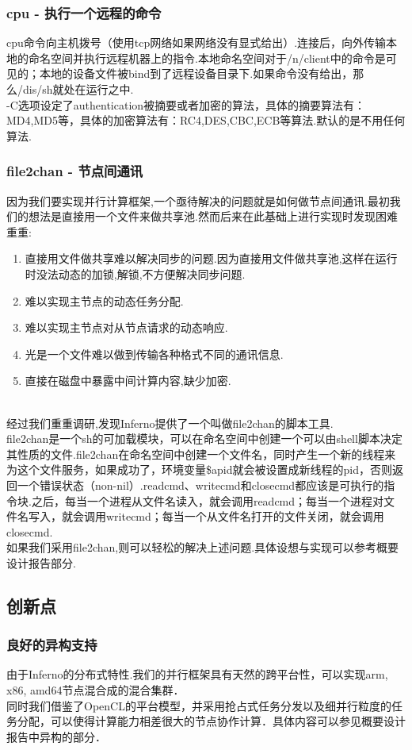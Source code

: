 \documentclass[paper=a4]{ctexart} %
\numberwithin{equation}{section} %
\numberwithin{figure}{section} %
\numberwithin{table}{section} %
\newcommand{\n}{\\\indent}
\begin{document}
\subsubsection{cpu - 执行一个远程的命令}
cpu命令向主机拨号（使用tcp网络如果网络没有显式给出）.连接后，向外传输本地的命名空间并执行远程机器上的指令.本地命名空间对于/n/client中的命令是可见的；本地的设备文件被bind到了远程设备目录下.如果命令没有给出，那么/dis/sh就处在运行之中. \n
-C选项设定了authentication被摘要或者加密的算法，具体的摘要算法有：MD4,MD5等，具体的加密算法有：RC4,DES,CBC,ECB等算法.默认的是不用任何算法.

\subsubsection{file2chan - 节点间通讯}
因为我们要实现并行计算框架,一个亟待解决的问题就是如何做节点间通讯.最初我们的想法是直接用一个文件来做共享池.然而后来在此基础上进行实现时发现困难重重:
\begin{enumerate}
\item 直接用文件做共享难以解决同步的问题.因为直接用文件做共享池,这样在运行时没法动态的加锁,解锁,不方便解决同步问题.
\item 难以实现主节点的动态任务分配.
\item 难以实现主节点对从节点请求的动态响应.
\item 光是一个文件难以做到传输各种格式不同的通讯信息.
\item 直接在磁盘中暴露中间计算内容,缺少加密.
\end{enumerate}
~\n
经过我们重重调研,发现Inferno提供了一个叫做file2chan的脚本工具.\n
file2chan是一个sh的可加载模块，可以在命名空间中创建一个可以由shell脚本决定其性质的文件.file2chan在命名空间中创建一个文件名，同时产生一个新的线程来为这个文件服务，如果成功了，环境变量\$apid就会被设置成新线程的pid，否则返回一个错误状态（non-nil）.readcmd、writecmd和closecmd都应该是可执行的指令块.之后，每当一个进程从文件名读入，就会调用readcmd；每当一个进程对文件名写入，就会调用writecmd；每当一个从文件名打开的文件关闭，就会调用closecmd.\n
如果我们采用file2chan,则可以轻松的解决上述问题.具体设想与实现可以参考概要设计报告部分.

\subsection{创新点}

\subsubsection{良好的异构支持}
由于Inferno的分布式特性.我们的并行框架具有天然的跨平台性，可以实现arm, x86, amd64节点混合成的混合集群．\n
同时我们借鉴了OpenCL的平台模型，并采用抢占式任务分发以及细并行粒度的任务分配，可以使得计算能力相差很大的节点协作计算．具体内容可以参见概要设计报告中异构的部分．
\end{document}
